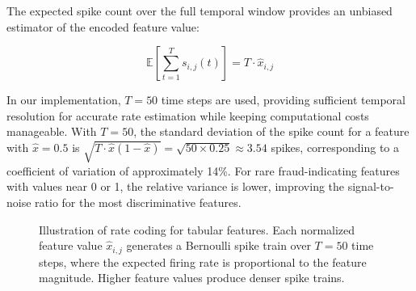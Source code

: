 The expected spike count over the full temporal window provides an unbiased estimator of the encoded feature value:

\begin{equation}
\mathbb{E}\left[\sum_{t=1}^{T} s_{i,j}(t)\right] = T \cdot \hat{x}_{i,j}
\label{eq:snn-expected-spikes}
\end{equation}

In our implementation, $T = 50$ time steps are used, providing sufficient temporal resolution for accurate rate estimation while keeping computational costs manageable. With $T = 50$, the standard deviation of the spike count for a feature with $\hat{x} = 0.5$ is $\sqrt{T \cdot \hat{x}(1-\hat{x})} = \sqrt{50 \times 0.25} \approx 3.54$ spikes, corresponding to a coefficient of variation of approximately 14\%. For rare fraud-indicating features with values near 0 or 1, the relative variance is lower, improving the signal-to-noise ratio for the most discriminative features.

\begin{figure}[H]
\centering
{}
\caption{Illustration of rate coding for tabular features. Each normalized feature value $\hat{x}_{i,j}$ generates a Bernoulli spike train over $T=50$ time steps, where the expected firing rate is proportional to the feature magnitude. Higher feature values produce denser spike trains.}
\label{fig:snn-rate-coding}
\end{figure}

